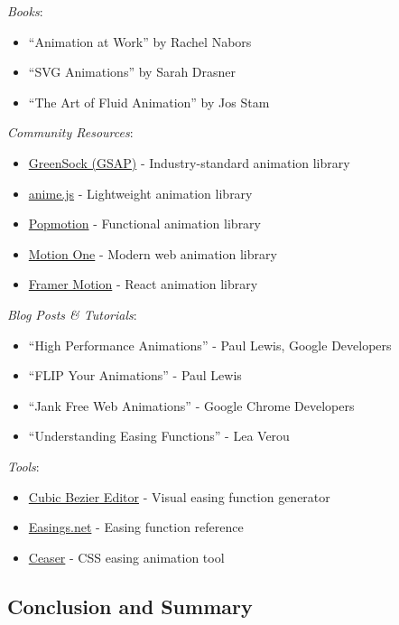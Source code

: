 \documentclass[11pt]{article}
\begin{document}
\emph{Books}:

\begin{itemize}
\item ``Animation at Work'' by Rachel Nabors
\item ``SVG Animations'' by Sarah Drasner
\item ``The Art of Fluid Animation'' by Jos Stam
\end{itemize}

\emph{Community Resources}:

\begin{itemize}
\item \href{https://greensock.com/}{GreenSock (GSAP)} - Industry-standard animation library
\item \href{https://animejs.com/}{anime.js} - Lightweight animation library
\item \href{https://popmotion.io/}{Popmotion} - Functional animation library
\item \href{https://motion.dev/}{Motion One} - Modern web animation library
\item \href{https://www.framer.com/motion/}{Framer Motion} - React animation library
\end{itemize}

\emph{Blog Posts \& Tutorials}:

\begin{itemize}
\item ``High Performance Animations'' - Paul Lewis, Google Developers
\item ``FLIP Your Animations'' - Paul Lewis
\item ``Jank Free Web Animations'' - Google Chrome Developers
\item ``Understanding Easing Functions'' - Lea Verou
\end{itemize}

\emph{Tools}:

\begin{itemize}
\item \href{https://cubic-bezier.com/}{Cubic Bezier Editor} - Visual easing function generator
\item \href{https://easings.net/}{Easings.net} - Easing function reference
\item \href{https://matthewlein.com/tools/ceaser}{Ceaser} - CSS easing animation tool
\end{itemize}
\subsection{Conclusion and Summary}
\label{sec:org6cca4db}
\end{document}
